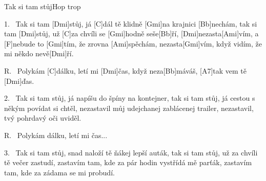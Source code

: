 \begin{song}{Tak si tam stůj}{Hop trop}

\begin{xverse}{1.~}
Tak si tam [\large Dmi]stůj, já [\large C]dál tě klidně [\large Gmi]na krajnici [\large Bb]nechám,
tak si tam [\large Dmi]stůj, už [\large C]za chvíli se [\large Gmi]hodně seše[\large Bb]{}ří,
[\large Dmi]nezasta[\large Ami]vím, a [\large F]nebude to [\large Gmi]tím, že zrovna [\large Ami]spěchám,
nezasta[\large Gmi]vím, když vidím, že mi někdo nevě[\large Dmi]{}ří.
\end{xverse}

\begin{xverse}{R.~}
Polykám [\large C]dálku, letí mi [\large Dmi]{}čas,
když neza[\large Bb]máváš, [\large A7]tak vem tě [\large Dmi]{}ďas.
\end{xverse}


\begin{xverse}{2.~}
Tak si tam stůj, já napíšu do špíny na kontejner,
tak si tam stůj, já cestou s někým povídat si chtěl,
nezastavil můj udejchanej zablácenej trailer,
nezastavil, tvý pohrdavý oči uviděl.
\end{xverse}


\begin{xverse}{R.~}
Polykám dálku, letí mi čas...
\end{xverse}


\begin{xverse}{3.~}
Tak si tam stůj, snad naloží tě ňákej lepší auták,
tak si tam stůj, už za chvíli tě večer zastudí,
zastavím tam, kde za pár hodin vystřídá mě parťák,
zastavím tam, kde za zádama se mi probudí.
\end{xverse}

\end{song}

